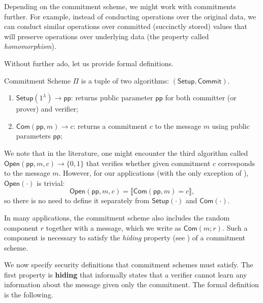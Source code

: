 \documentclass[../../book]{subfiles}
\begin{document}
Depending on the commitment scheme, we might work with commitments further.
For example, instead of conducting operations over the original data, we can conduct similar operations over committed (succinctly stored) values that will preserve operations over underlying data (the property called \emph{homomorphism}).

Without further ado, let us provide formal definitions.

\begin{definition}
    Commitment Scheme $\Pi$ is a tuple of two algorithms: $(\mathsf{Setup}, \mathsf{Commit})$.

    \begin{enumerate}
        \item $\mathsf{Setup}(1^{\lambda}) \to \mathsf{pp}$: returns public parameter $\mathsf{pp}$ for both committer (or prover) and verifier;
        \item $\mathsf{Com}(\mathsf{pp}, m) \to c$: returns a commitment $c$ to the message $m$ using public parameters $\mathsf{pp}$;
    \end{enumerate}
\end{definition}

We note that in the literature, one might encounter the third algorithm called $\mathsf{Open}(\mathsf{pp}, m, c) \to \{0,1\}$ that verifies whether given commitment $c$ corresponds to the message $m$.
However, for our applications (with the only exception of ), $\mathsf{Open}(\cdot)$ is trivial:
\begin{equation*}
    \mathsf{Open}(\mathsf{pp}, m, c) = \llbracket \mathsf{Com}(\mathsf{pp}, m) = c \rrbracket,
\end{equation*}
so there is no need to define it separately from $\mathsf{Setup}(\cdot)$ and $\mathsf{Com}(\cdot)$.

\begin{remark}
    In many applications, the commitment scheme also includes the random component $r$ together with a message, which we write as $\mathsf{Com}(m;r)$.
    Such a component is necessary to satisfy the \emph{hiding} property (see ) of a commitment scheme.
\end{remark}

We now specify security definitions that commitment schemes must satisfy.
The first property is \textbf{hiding} that informally states that a verifier cannot learn any information about the message given only the commitment.
The formal definition is the following.
\end{document}
